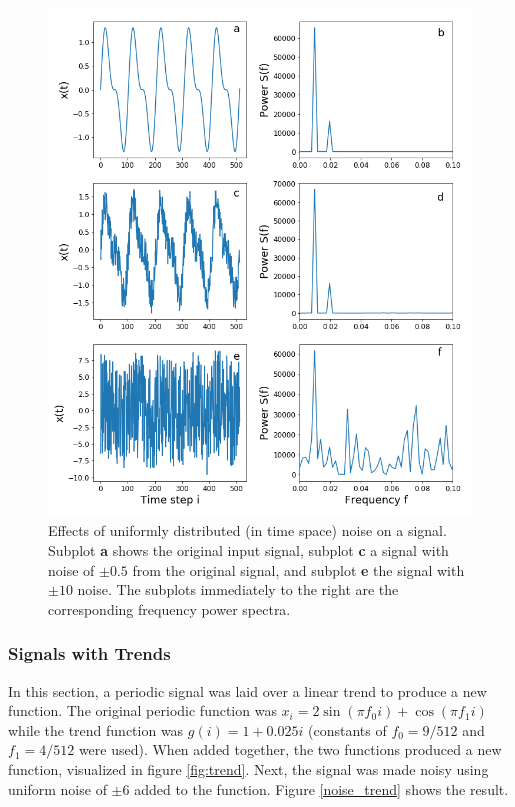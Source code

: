 \documentclass[twocolumn]{article}
\begin{document}
\begin{figure}[t]
	\centering
	\includegraphics[height=\paperwidth]{spectral_filter}
	\caption{Effects of uniformly distributed (in time space) noise on a signal. Subplot \textbf{a} shows the original input signal, subplot \textbf{c} a signal with noise of $\pm0.5$ from the original signal, and subplot \textbf{e} the signal with $\pm10$ noise. The subplots immediately to the right are the corresponding frequency power spectra.}
	\label{fig:spectral_filter}
\end{figure}

\subsubsection{Signals with Trends}
In this section, a periodic signal was laid over a linear trend to produce a new function. The original periodic function was $x_i = 2\sin(\pi f_0 i) + \cos( \pi f_1 i)$ while the trend function was $g(i) = 1 + 0.025i$ (constants of $f_0 = 9/512$ and $f_1=4/512$ were used). When added together, the two functions produced a new function, visualized in figure \ref{fig:trend}.
Next, the signal was made noisy using uniform noise of $\pm6$ added to the function. Figure \ref{noise_trend} shows the result.
\end{document}
